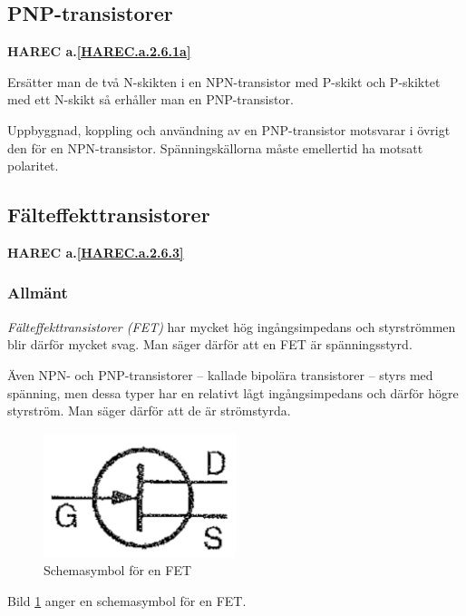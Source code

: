 \subsection{PNP-transistorer}
\textbf{HAREC a.\ref{HAREC.a.2.6.1a}\label{myHAREC.a.2.6.1a}}

Ersätter man de två N-skikten i en NPN-transistor med P-skikt och P-skiktet med
ett N-skikt så erhåller man en PNP-transistor.

Uppbyggnad, koppling och användning av en PNP-transistor motsvarar i övrigt den
för en NPN-transistor. Spänningskällorna måste emellertid ha motsatt polaritet.

\subsection{Fälteffekttransistorer}
\textbf{HAREC a.\ref{HAREC.a.2.6.3}\label{myHAREC.a.2.6.3}}

\subsubsection{Allmänt}

\emph{Fälteffekttransistorer (FET)} har mycket hög ingångsimpedans och
styrströmmen blir därför mycket svag.
Man säger därför att en FET är spänningsstyrd.

Även NPN- och PNP-transistorer -- kallade bipolära transistorer -- styrs med
spänning, men dessa typer har en relativt lågt ingångsimpedans och därför högre
styrström. Man säger därför att de är strömstyrda.

\begin{figure}
\includegraphics[width=0.5\textwidth]{images/cropped_pdfs/bild_2_2-20.pdf}
\caption{Schemasymbol för en FET}
\label{fig:BildII2-20}
\end{figure}

Bild \ref{fig:BildII2-20} anger en schemasymbol för en FET.

